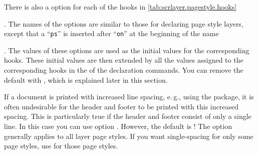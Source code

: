 \begin{Declaration}
\end{Declaration}
%
%
There is also a \KOMAScript{} option for each of the hooks in
\autoref{tab:scrlayer.pagestyle.hooks}%
\iftrue
. The names of the \KOMAScript{} options are similar to those for declaring
page style layers, except that a ``\texttt{ps}'' is inserted after
``\texttt{on}'' at the beginning of the name
\else
, into the names of which a ``\texttt{ps}'' is inserted
\fi
. The values of these \KOMAScript{} options are used as the initial values for
the corresponding hooks. These initial values are then extended by all the
values assigned to the corresponding hooks in the  of the
declaration commands. You can remove the default with
, which is explained later
in this section.%
\EndIndexGroup


\begin{Declaration}
\end{Declaration}
If a
document is printed with increased line spacing, e.\,g., using the
package, it is often undesirable for the header and footer to be printed with
this increased spacing. This is particularly true if the header and footer
consist of only a single line. In this case you can use \KOMAScript{} option
. However, the default is
! The option generally applies to all layer
page styles. If you want single-spacing for only some page styles, use
 for
those page styles.%
\EndIndexGroup


